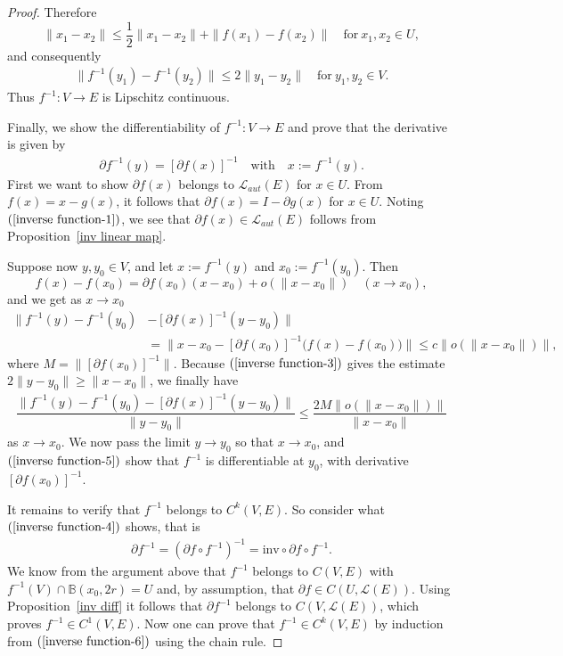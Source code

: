 \begin{proof}
Therefore
\[\|x_1-x_2\|\leq\dfrac{1}{2}\|x_1-x_2\|+\|f(x_1)-f(x_2)\|\quad\text{for}\ x_1,x_2\in U,\]
and consequently
\begin{align}\label{inverse function-3}
\|f^{-1}(y_1)-f^{-1}(y_2)\|\leq 2\|y_1-y_2\|\quad\text{for}\ y_1,y_2\in V.
\end{align}
Thus $f^{-1}:V\to E$ is Lipschitz continuous.\par
Finally, we show the differentiability of $f^{-1}:V\to E$ and prove that the derivative is given by
\begin{align}\label{inverse function-4}
\partial f^{-1}(y)=[\partial f(x)]^{-1}\quad\text{with}\quad x:=f^{-1}(y).
\end{align}
First we want to show $\partial f(x)$ belongs to $\mathcal{L}_{aut}(E)$ for $x\in U$. From $f(x)=x-g(x)$, it follows that $\partial f(x)=I-\partial g(x)$ for $x\in U$. Noting $(\ref{inverse function-1})$, we see that $\partial f(x)\in\mathcal{L}_{aut}(E)$ follows from Proposition~\ref{inv linear map}.\par
Suppose now $y,y_0\in V$, and let $x:=f^{-1}(y)$ and $x_0:=f^{-1}(y_0)$. Then
\[f(x)-f(x_0)=\partial f(x_0)(x-x_0)+o(\|x-x_0\|)\quad (x\to x_0),\]
and we get as $x\to x_0$
\begin{align*}
\big\|f^{-1}(y)-f^{-1}(y_0)&-[\partial f(x)]^{-1}(y-y_0)\big\|\\
&=\big\|x-x_0-[\partial f(x_0)]^{-1}\big(f(x)-f(x_0)\big)\big\|\leq c\big\|o(\|x-x_0\|)\big\|,
\end{align*}
where $M=\big\|[\partial f(x_0)]^{-1}\big\|$. Because $(\ref{inverse function-3})$ gives the estimate $2\|y-y_0\|\geq\|x-x_0\|$, we finally have
\begin{align}\label{inverse function-5}
\dfrac{\big\|f^{-1}(y)-f^{-1}(y_0)-[\partial f(x)]^{-1}(y-y_0)\big\|}{\|y-y_0\|}\leq\dfrac{2M\big\|o(\|x-x_0\|)\big\|}{\|x-x_0\|}
\end{align}
as $x\to x_0$. We now pass the limit $y\to y_0$ so that $x\to x_0$, and $(\ref{inverse function-5})$ show that $f^{-1}$ is differentiable at $y_0$, with derivative $[\partial f(x_0)]^{-1}$.\par
It remains to verify that $f^{-1}$ belongs to $C^k(V,E)$. So consider what
$(\ref{inverse function-4})$ shows, that is
\begin{align}\label{inverse function-6}
\partial f^{-1}=(\partial f\circ f^{-1})^{-1}=\mathrm{inv}\circ \partial f\circ f^{-1}.
\end{align}
We know from the argument above that $f^{-1}$ belongs to $C(V,E)$ with $f^{-1}(V)\cap\mathbb{B}(x_0,2r)=U$ and, by assumption, that $\partial f\in C(U,\mathcal{L}(E))$. Using Proposition~\ref{inv diff} it follows that $\partial f^{-1}$ belongs to $C(V,\mathcal{L}(E))$, which proves $f^{-1}\in C^1(V,E)$. Now one can prove that $f^{-1}\in C^k(V,E)$ by induction from $(\ref{inverse function-6})$ using the chain rule.
\end{proof}
